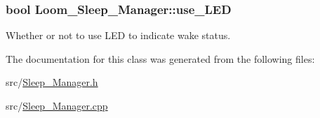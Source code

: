 \subsubsection[{\texorpdfstring{use\+\_\+\+L\+ED}{use_LED}}]{\setlength{\rightskip}{0pt plus 5cm}bool Loom\+\_\+\+Sleep\+\_\+\+Manager\+::use\+\_\+\+L\+ED\hspace{0.3cm}{\ttfamily [protected]}}\hypertarget{class_loom___sleep___manager_ae9ffd9f5310fdac6d1df1f23741598a6}{}\label{class_loom___sleep___manager_ae9ffd9f5310fdac6d1df1f23741598a6}


Whether or not to use L\+ED to indicate wake status. 



The documentation for this class was generated from the following files\+:\begin{DoxyCompactItemize}
\item 
src/\hyperlink{_sleep___manager_8h}{Sleep\+\_\+\+Manager.\+h}\item 
src/\hyperlink{_sleep___manager_8cpp}{Sleep\+\_\+\+Manager.\+cpp}\end{DoxyCompactItemize}
